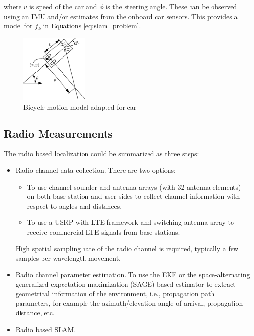 where $v$ is speed of the car and $\phi$ is the steering angle. 
These can be observed using an \gls{IMU} and/or estimates from the onboard car 
sensors. This provides a model for $f_k$ in Equations \eqref{eq:slam_problem}.


\begin{figure}
\centering
\label{fig:motion_model}
\includegraphics[width=0.3\textwidth]{figures/bicycle_model.pdf}
\caption{Bicycle motion model adapted for car}
\end{figure}


\subsection{Radio Measurements}\label{sec:radio_measurements}

The radio based localization could be summarized as three steps:

\begin{itemize}
\item Radio channel data collection. There are two options: 
  \begin{itemize}
  \item To use channel sounder and antenna arrays (with 32 antenna elements) on both base station and user sides to collect channel information with respect to angles and distances.
  \item To use a USRP with \gls{LTE} framework and switching antenna array to 
  receive commercial LTE signals from base stations.
  \end{itemize}
High spatial sampling rate of the radio channel is required, typically a few samples per wavelength movement. 
\item Radio channel parameter estimation. To use the \gls{EKF} or the 
space-alternating generalized expectation-maximization (SAGE) based estimator 
to extract geometrical information of the environment, i.e., propagation path 
parameters, for example the azimuth/elevation angle of arrival, propagation 
distance, etc. 
\item Radio based SLAM. 
\end{itemize}

